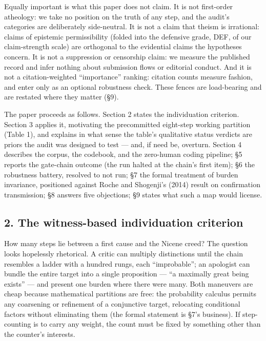 Equally important is what this paper does not claim. It is not first-order atheology: we take no position on the truth of any step, and the audit's categories are deliberately side-neutral. It is not a claim that theism is irrational: claims of epistemic permissibility (folded into the defensive grade, DEF, of our claim-strength scale) are orthogonal to the evidential claims the hypotheses concern. It is not a suppression or censorship claim: we measure the published record and infer nothing about submission flows or editorial conduct. And it is not a citation-weighted ``importance'' ranking: citation counts measure fashion, and enter only as an optional robustness check. These fences are load-bearing and are restated where they matter (\S{}9).

The paper proceeds as follows. Section 2 states the individuation criterion. Section 3 applies it, motivating the precommitted eight-step working partition (Table 1), and explains in what sense the table's qualitative status verdicts are priors the audit was designed to test --- and, if need be, overturn. Section 4 describes the corpus, the codebook, and the zero-human coding pipeline; \S{}5 reports the gate-chain outcome (the run halted at the chain's first item); \S{}6 the robustness battery, resolved to not run; \S{}7 the formal treatment of burden invariance, positioned against Roche and Shogenji's (2014) result on confirmation transmission; \S{}8 answers five objections; \S{}9 states what such a map would license.

\subsection{2. The witness-based individuation criterion}\label{the-witness-based-individuation-criterion}

How many steps lie between a first cause and the Nicene creed? The question looks hopelessly rhetorical. A critic can multiply distinctions until the chain resembles a ladder with a hundred rungs, each ``improbable''; an apologist can bundle the entire target into a single proposition --- ``a maximally great being exists'' --- and present one burden where there were many. Both maneuvers are cheap because mathematical partitions are free: the probability calculus permits any coarsening or refinement of a conjunctive target, relocating conditional factors without eliminating them (the formal statement is \S{}7's business). If step-counting is to carry any weight, the count must be fixed by something other than the counter's interests.

